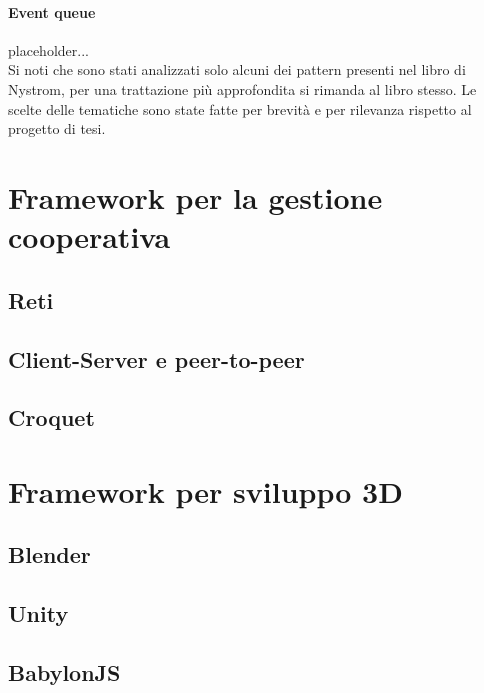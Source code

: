 \paragraph{Event queue}
placeholder...\\
\newline
Si noti che sono stati analizzati solo alcuni dei pattern presenti nel libro di 
Nystrom, per una trattazione più approfondita si rimanda al libro stesso. Le scelte
delle tematiche sono state fatte per brevità e per rilevanza rispetto al progetto
di tesi.

\section{Framework per la gestione cooperativa}\label{sec:Cooperativa}
\subsection{Reti}\label{ssec:Reti}
\subsection{Client-Server e peer-to-peer}\label{ssec:CS&P2P}
\subsection{Croquet}\label{ssec:IntroCroquet}

\section{Framework per sviluppo 3D}\label{sec:FW3D}
\subsection{Blender}\label{ssec:Blender}
\subsection{Unity}\label{ssec:Unity}
\subsection{BabylonJS}\label{ssec:IntroBabylonJS}